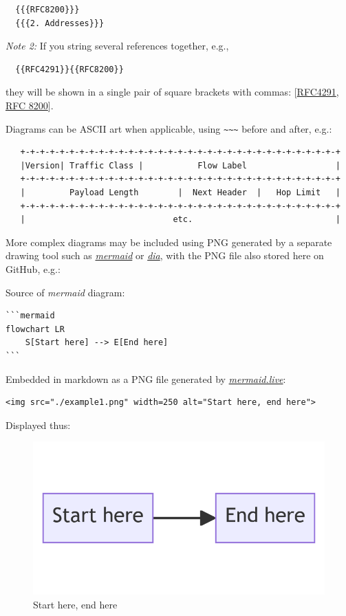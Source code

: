 \documentclass[
]{article}
\begin{document}
\begin{verbatim}
  {{{RFC8200}}}
  {{{2. Addresses}}}
\end{verbatim}

\emph{Note 2:} If you string several references together, e.g.,

\begin{verbatim}
  {{RFC4291}}{{RFC8200}}
\end{verbatim}

they will be shown in a single pair of square brackets with commas:
{[}\href{https://www.rfc-editor.org/info/rfc4291}{RFC4291},
\href{https://www.rfc-editor.org/info/rfc8200}{RFC 8200}{]}.

Diagrams can be ASCII art when applicable, using
\texttt{\textasciitilde{}\textasciitilde{}\textasciitilde{}} before and
after, e.g.:

\begin{verbatim}
   +-+-+-+-+-+-+-+-+-+-+-+-+-+-+-+-+-+-+-+-+-+-+-+-+-+-+-+-+-+-+-+-+
   |Version| Traffic Class |           Flow Label                  |
   +-+-+-+-+-+-+-+-+-+-+-+-+-+-+-+-+-+-+-+-+-+-+-+-+-+-+-+-+-+-+-+-+
   |         Payload Length        |  Next Header  |   Hop Limit   |
   +-+-+-+-+-+-+-+-+-+-+-+-+-+-+-+-+-+-+-+-+-+-+-+-+-+-+-+-+-+-+-+-+
   |                              etc.                             |
\end{verbatim}

More complex diagrams may be included using PNG generated by a separate
drawing tool such as \href{https://mermaid.live}{\emph{mermaid}} or
\href{http://dia-installer.de/}{\emph{dia}}, with the PNG file also
stored here on GitHub, e.g.:

Source of \emph{mermaid} diagram:

\begin{verbatim}
```mermaid
flowchart LR
    S[Start here] --> E[End here]
```
\end{verbatim}

Embedded in markdown as a PNG file generated by
\href{https://mermaid.live}{\emph{mermaid.live}}:

\begin{verbatim}
<img src="./example1.png" width=250 alt="Start here, end here">
\end{verbatim}

Displayed thus:

\begin{figure}
\centering
\includegraphics{example1.png}
\caption{Start here, end here}
\end{figure}
\end{document}
